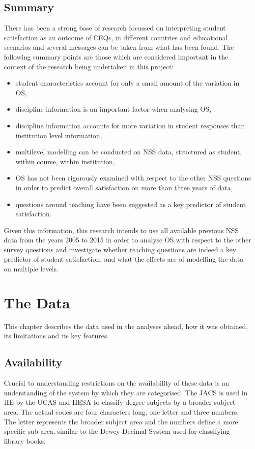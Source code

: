 \documentclass[11pt,a4paper]{report}
\begin{document}
\section{Summary}
There has been a strong base of research focussed on interpreting student satisfaction as an outcome of \ac{CEQ}s, in different countries and educational scenarios and several messages can be taken from what has been found. The following summary points are those which are considered important in the context of the research being undertaken in this project:
\begin{itemize}
	\item student characteristics account for only a small amount of the variation in \ac{OS},
	\item discipline information is an important factor when analysing \ac{OS},
	\item discipline information accounts for more variation in student responses than institution level information,
	\item multilevel modelling can be conducted on NSS data, structured as student, within course, within institution,
	\item \ac{OS} has not been rigorously examined with respect to the other NSS questions in order to predict overall satisfaction on more than three years of data, 
	\item questions around teaching have been suggested as a key predictor of student satisfaction.
\end{itemize}

Given this information, this research intends to use all available previous NSS data from the years 2005 to 2015 in order to analyse \ac{OS} with respect to the other survey questions and investigate whether teaching questions are indeed a key predictor of student satisfaction, and what the effects are of modelling the data on multiple levels.

\newpage
\chapter{The Data} \label{Data}
This chapter describes the data used in the analyses ahead, how it was obtained, its limitations and its key features. 
\section{Availability} \label{Data Availability}
Crucial to understanding restrictions on the availability of these data is an understanding of the system by which they are categorised. The \ac{JACS} is used in HE by the \ac{UCAS} and \ac{HESA} to classify degree subjects by a broader subject area. The actual codes are four characters long, one letter and three numbers. The letter represents the broader subject area and the numbers define a more specific sub-area, similar to the Dewey Decimal System used for classifying library books.
\end{document}
